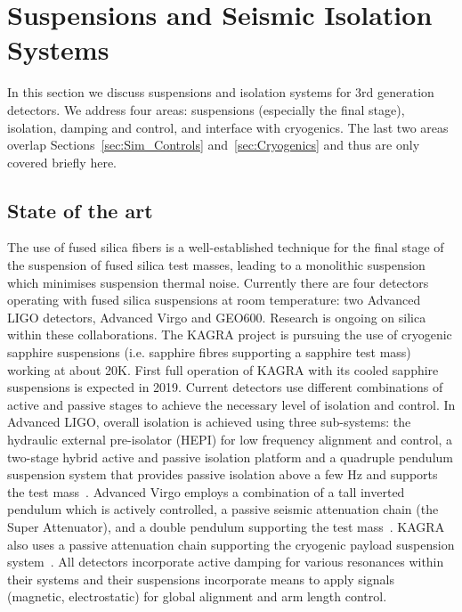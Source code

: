 \chapter{Suspensions and Seismic Isolation Systems}
\label{sec:Suspensions_Isolation}

\begin{samepage} %

In this section we discuss suspensions and isolation systems for 3rd generation detectors. We address four areas: suspensions (especially the final stage), isolation, damping and control, and interface with cryogenics. The last two areas overlap Sections~\ref{sec:Sim_Controls} and~\ref{sec:Cryogenics} and thus are only covered briefly here.

\section{State of the art}
The use of fused silica fibers is a well-established technique for the final stage of the suspension of fused silica test masses, leading to a monolithic suspension which minimises suspension thermal noise. Currently there are four detectors operating with fused silica suspensions at room temperature: two Advanced LIGO detectors, Advanced Virgo and GEO600. Research is ongoing on silica within these collaborations.
The KAGRA project is pursuing the use of cryogenic sapphire suspensions (i.e. sapphire fibres supporting a sapphire test mass) working at about 20K. First full operation of KAGRA with its cooled sapphire suspensions is expected in 2019.
Current detectors use different combinations of active and passive stages to achieve the necessary level of isolation and control. In Advanced LIGO, overall isolation is achieved using three sub-systems: the hydraulic external pre-isolator (HEPI) for low frequency alignment and control, a two-stage hybrid active and passive isolation platform and a quadruple pendulum suspension system that provides passive isolation above a few Hz and supports the test mass~\cite{Matichard_2015}. Advanced Virgo employs a combination of a tall inverted pendulum which is actively controlled, a passive seismic attenuation chain (the Super Attenuator), and a double pendulum supporting the test mass~\cite{AdvancedVirgo2015}. KAGRA also uses a passive attenuation chain supporting the cryogenic payload suspension system~\cite{KAGRA2013}. All detectors incorporate active damping for various resonances within their systems and their suspensions incorporate means to apply signals (magnetic, electrostatic) for global alignment and arm length control.


\end{samepage}
